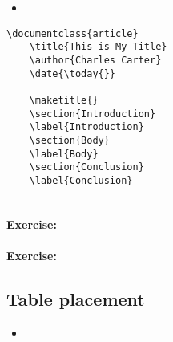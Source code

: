         \begin{framed}
            \begin{itemize}
                \item{}
            \end{itemize}
        \end{framed}


        \begin{verbatim}
\documentclass{article}
    \title{This is My Title}
    \author{Charles Carter}
    \date{\today{}}
 
    \maketitle{}
    \section{Introduction}
    \label{Introduction}
    \section{Body}
    \label{Body}
    \section{Conclusion}
    \label{Conclusion}
    
        \end{verbatim}

        \paragraph{Exercise:}

        \paragraph{Exercise:}


        \subsection{Table placement}
        \label{Table placement}
        
        \begin{framed}
            \begin{itemize}
                \item{}
            \end{itemize}
        \end{framed}


